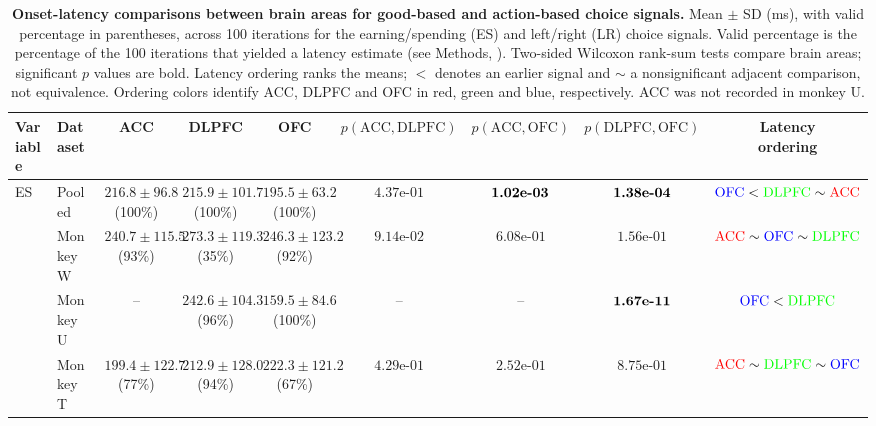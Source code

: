 \documentclass[pdflatex,sn-mathphys-num]{sn-jnl}%
\newcommand{\ACCc}{\textcolor{regionACC}{\mathrm{ACC}}}
\newcommand{\DLPFCc}{\textcolor{regionDLPFC}{\mathrm{DLPFC}}}
\newcommand{\OFCc}{\textcolor{regionOFC}{\mathrm{OFC}}}
\begin{document}
\clearpage
\begin{table}[p]\centering
\caption{\textbf{Onset-latency comparisons between brain areas for good-based and action-based choice signals.} Mean $\pm$ SD (ms), with valid percentage in parentheses, across 100 iterations for the earning/spending (ES) and left/right (LR) choice signals. Valid percentage is the percentage of the 100 iterations that yielded a latency estimate (see Methods, ). Two-sided Wilcoxon rank-sum tests compare brain areas; significant $p$ values are bold. Latency ordering ranks the means; $<$ denotes an earlier signal and $\sim$ a nonsignificant adjacent comparison, not equivalence. Ordering colors identify ACC, DLPFC and OFC in red, green and blue, respectively. ACC was not recorded in monkey U.}
\label{tab:supp_choice_onset_regions}
\begingroup\fontsize{6.5}{8}\selectfont\setlength{\tabcolsep}{1pt}
\begin{tabular*}{\textwidth}{@{\extracolsep{\fill}}llccccccc@{}}\toprule
Variable & Dataset & ACC & DLPFC & OFC & $p(\mathrm{ACC},\mathrm{DLPFC})$ & $p(\mathrm{ACC},\mathrm{OFC})$ & $p(\mathrm{DLPFC},\mathrm{OFC})$ & \shortstack{Latency\\ordering}\\\midrule
ES & Pooled & \shortstack[c]{$216.8\pm96.8$\\(100\%)} & \shortstack[c]{$215.9\pm101.7$\\(100\%)} & \shortstack[c]{$195.5\pm63.2$\\(100\%)} & $\mbox{4.37e-01}$ & $\text{\bfseries \mbox{1.02e-03}}$ & $\text{\bfseries \mbox{1.38e-04}}$ & $\OFCc < \DLPFCc \sim \ACCc$ \\
  & Monkey W & \shortstack[c]{$240.7\pm115.5$\\(93\%)} & \shortstack[c]{$273.3\pm119.3$\\(35\%)} & \shortstack[c]{$246.3\pm123.2$\\(92\%)} & $\mbox{9.14e-02}$ & $\mbox{6.08e-01}$ & $\mbox{1.56e-01}$ & $\ACCc \sim \OFCc \sim \DLPFCc$ \\
  & Monkey U & -- & \shortstack[c]{$242.6\pm104.3$\\(96\%)} & \shortstack[c]{$159.5\pm84.6$\\(100\%)} & -- & -- & $\text{\bfseries \mbox{1.67e-11}}$ & $\OFCc < \DLPFCc$ \\
  & Monkey T & \shortstack[c]{$199.4\pm122.7$\\(77\%)} & \shortstack[c]{$212.9\pm128.0$\\(94\%)} & \shortstack[c]{$222.3\pm121.2$\\(67\%)} & $\mbox{4.29e-01}$ & $\mbox{2.52e-01}$ & $\mbox{8.75e-01}$ & $\ACCc \sim \DLPFCc \sim \OFCc$ \\

\end{tabular*}
\end{table}
\end{document}
